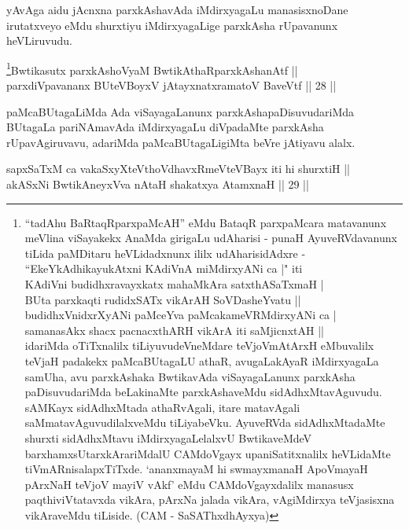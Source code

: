 \begin{artha}
yAvAga aidu jAcnxna parxkAshavAda iMdirxyagaLu manasisxnoDane
irutatxveyo eMdu shurxtiyu iMdirxyagaLige parxkAsha rUpavanunx
heVLiruvudu.
\end{artha}

\begin{shl}
\footnote{``tadAhu BaRtaqRparxpaMcAH'' eMdu BataqR parxpaMcara matavanunx meVlina viSayakekx AnaMda girigaLu udAharisi - punaH AyuveRVdavanunx tiLida paMDitaru heVLidadxnunx ililx udAharisidAdxre -  ``EkeYkAdhikayukAtxni KAdiVnA miMdirxyANi ca |" iti \\ KAdiVni budidhxravayxkatx mahaMkAra satxthA\s  SaTxmaH |\\ BUta parxkaqti rudidxSATx vikArAH SoVDasheYvatu ||\\ budidhxVnidxrXyANi paMceYva paMcakameVRMdirxyANi ca |\\ samanasAkx shacx pacnacxthARH vikArA iti saMjicnxtAH ||\\ idariMda oTiTxnalilx tiLiyuvudeVneMdare teVjoVmAtArxH eMbuvalilx teVjaH padakekx paMcaBUtagaLU athaR, avugaLakAyaR iMdirxyagaLa samUha, avu parxkAshaka BwtikavAda viSayagaLanunx parxkAsha paDisuvudariMda beLakinaMte parxkAshaveMdu sidAdhxMtavAguvudu. sAMKayx sidAdhxMtada athaR\-vAgali, itare matavAgali saMmatavAguvudilalxveMdu tiLiyabeVku. AyuveRVda sidAdhxMtadaMte shurxti sidAdhxMtavu iMdirxyagaLelalxvU BwtikaveMdeV barxhamxsUtarxkArariMdalU CAMdoVgayx upaniSatitxnalilx heVLidaMte tiVmARnisalapxTiTxde. `ananxmayaM hi swmayxmanaH ApoVmayaH pArxNaH teVjoV mayiV vAkf' eMdu CAMdoVgayxdalilx manasusx paqthiviVtatavxda vikAra, pArxNa jalada vikAra, vAgiMdirxya teVjasisxna vikAraveMdu tiLiside. (CAM - SaSAThxdhAyxya)}Bwtikasutx parxkAshoV\s yaM BwtikAthaRparxkAshanAtf || \\
parxdiVpavananx BUteVBoyxV jAtayxnatxramatoV BaveVtf \hfill || 28 ||
  
\end{shl}

\begin{artha}
paMcaBUtagaLiMda Ada viSayagaLanunx
parxkAshapaDisuvudariMda BUtagaLa pariNAmavAda iMdirxyagaLu diVpadaMte
parxkAsha rUpavAgiruvavu, adariMda paMcaBUtagaLigiMta beVre jAtiyavu alalx.
\end{artha}


\begin{shl}
sapxSaTxM ca vakaSxyXteV\s thoVdhavxRmeVteVBayx iti hi shurxtiH || \\
akASxNi BwtikAneyxVva nAtaH shakatxya AtamxnaH \hfill || 29 ||
  
\end{shl}

